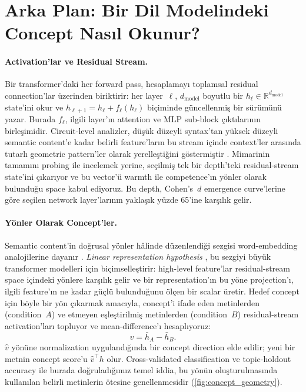 \documentclass[twocolumn]{article}
\begin{document}
\section*{Arka Plan: Bir Dil Modelindeki Concept Nasıl Okunur?}

\paragraph{Activation'lar ve Residual Stream.}
Bir transformer'daki her forward pass, hesaplamayı toplamsal residual
connection'lar üzerinden biriktirir: her layer~$\ell$,
$d_{\mathrm{model}}$ boyutlu bir $h_\ell \in
\mathbb{R}^{d_{\mathrm{model}}}$ state'ini okur ve
$h_{\ell+1} = h_\ell + f_\ell(h_\ell)$ biçiminde güncellenmiş bir sürümünü
yazar. Burada $f_\ell$, ilgili layer'ın attention ve MLP sub-block
çıktılarının birleşimidir. Circuit-level analizler, düşük düzeyli syntax'tan
yüksek düzeyli semantic content'e kadar belirli feature'ların bu stream içinde
context'ler arasında tutarlı geometric pattern'ler olarak yerelleştiğini
göstermiştir \citep{olah2020zoom}. Mimarinin tamamını probing ile incelemek
yerine, seçilmiş tek bir depth'teki residual-stream state'ini çıkarıyor ve bu
vector'ü warmth ile competence'ın yönler olarak bulunduğu space kabul ediyoruz.
Bu depth, Cohen's~$d$ emergence curve'lerine göre seçilen network layer'larının
yaklaşık yüzde 65'ine karşılık gelir.

\paragraph{Yönler Olarak Concept'ler.}
Semantic content'in doğrusal yönler hâlinde düzenlendiği sezgisi word-embedding
analojilerine dayanır \citep{mikolov2013word2vec}. \textit{Linear
representation hypothesis} \citep{park2024linear}, bu sezgiyi büyük
transformer modelleri için biçimselleştirir: high-level feature'lar
residual-stream space içindeki yönlere karşılık gelir ve bir representation'ın
bu yöne projection'ı, ilgili feature'ın ne kadar güçlü bulunduğunu ölçen bir
scalar üretir. Hedef concept için böyle bir yön çıkarmak amacıyla, concept'i
ifade eden metinlerden (condition~$A$) ve etmeyen eşleştirilmiş metinlerden
(condition~$B$) residual-stream activation'ları topluyor ve mean-difference'ı
hesaplıyoruz:
\begin{equation}
  v = \bar{h}_{A} - \bar{h}_{B}.
  \label{eq:mean_diff}
\end{equation}
$\hat{v}$ yönüne normalization uygulandığında bir concept direction elde edilir;
yeni bir metnin concept score'u $\hat{v}^{\!\top} h$ olur. Cross-validated
classification ve topic-holdout accuracy ile burada doğruladığımız temel iddia,
bu yönün oluşturulmasında kullanılan belirli metinlerin ötesine genellenmesidir
(\autoref{fig:concept_geometry}).
\end{document}

